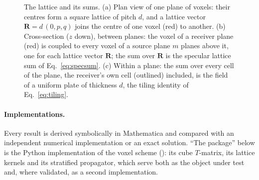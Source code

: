 \documentclass[extra,mreferee]{gji}
\newcommand{\bS}{\mathbf{S}}
\newcommand{\bP}{\mathbf{P}}
\begin{document}
\begin{figure}
{}
\caption{The lattice and its sums. (a) Plan view of one plane of voxels: their centres form a square
lattice of pitch $d$, and a lattice vector $\mathbf R=d\,(0,p,q)$ joins the centre of one voxel (red)
to another. (b) Cross-section ($z$ down), between planes: the voxel of a receiver plane (red) is coupled
to every voxel of a source plane $m$ planes above it, one for each lattice vector $\mathbf R$; the sum
over $\mathbf R$ is the specular lattice sum of Eq.~\eqref{eq:specsum}. (c) Within a plane: the sum
over every cell of the plane, the receiver's own cell (outlined) included, is the field of a uniform
plate of thickness $d$, the tiling identity of Eq.~\eqref{eq:tiling}.}
\label{fig:lattice}
\par{}
\end{figure}

\paragraph{Implementations.} Every result is derived symbolically in Mathematica and compared with
an independent numerical implementation or an exact solution. ``The package'' below is the Python
implementation of the voxel scheme (): its cube $T$-matrix, its lattice
kernels and its stratified propagator, which serve both as the object under test and, where
validated, as a second implementation.
\end{document}
